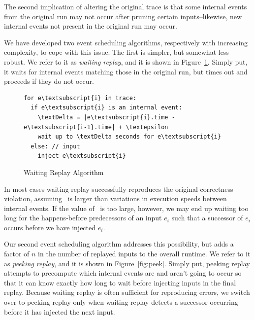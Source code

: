 The second implication of altering the original trace is that
some internal events from the original run may not occur after
pruning certain inputs--likewise, new internal events not present in the original run
may occur.

We have developed two event scheduling algorithms, respectively with increasing
complexity, to cope with this
issue. The first is simpler, but somewhat less robust. We refer to it as
\emph{waiting replay}, and it is shown in Figure~\ref{fig:simple_algorithm}.
Simply put, it waits for internal events matching those in the original run,
but times out and proceeds if they do not occur.

\begin{figure}
\begin{boxedminipage}{\linewidth}
\begin{Verbatim}[commandchars=\\\{\}]
for e\textsubscript{i} in trace:
  if e\textsubscript{i} is an internal event:
    \textDelta = |e\textsubscript{i}.time - e\textsubscript{i-1}.time| + \textepsilon
    wait up to \textDelta seconds for e\textsubscript{i}
  else: // input
    inject e\textsubscript{i}
\end{Verbatim}
\end{boxedminipage}
\caption{Waiting Replay Algorithm}
\label{fig:simple_algorithm}
\end{figure}

In most cases waiting replay successfully reproduces the original correctness
violation, assuming \textepsilon~is larger than variations in execution speeds
between internal events. If the value of \textepsilon~is too large, however, we may end up
waiting too long for the happens-before predecessors of an input $e_i$
such that a successor of $e_i$ occurs before we have injected $e_i$.

Our second event scheduling algorithm addresses this possibility, but
adds a factor of $n$ in the number of replayed inputs to the overall runtime. We refer to it as \emph{peeking
replay}, and it is shown in Figure~\ref{fig:peek}. Simply put, peeking replay
attempts to precompute which internal events are and aren't going to occur
so that it can know exactly how long to wait before injecting inputs in the
final replay. Because waiting replay is often sufficient for reproducing
errors, we switch over to peeking replay only when waiting replay detects a
successor occurring before it has injected the next input.


